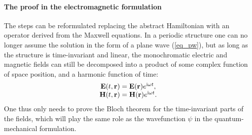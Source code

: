 \paragraph{The proof in the electromagnetic formulation}%
The steps can be reformulated replacing the abstract Hamiltonian with an operator derived from the Maxwell equations. In a periodic structure one can no longer assume the solution in the form of a plane wave (\ref{eq_pw}), but as long as the structure is time-invariant and linear, the monochromatic electric and magnetic fields can still be decomposed into a product of some complex function of space position, and a harmonic function of time:
\begin{equation} 
\begin{array}{cc}
\mathbf{E}(t, {\mathbf{r}}) = \mathbf{E}({\mathbf{r}}) e^{{\mathrm i} \omega t}, \\
\mathbf{H}(t, {\mathbf{r}}) = \mathbf{H}({\mathbf{r}}) e^{{\mathrm i} \omega t}. 
\end{array}
\label{eq_harmonic}\end{equation}
One thus only needs to prove the Bloch theorem for the time-invariant parts of the fields, which will play the same role as the wavefunction $\psi$ in the quantum-mechanical formulation.

